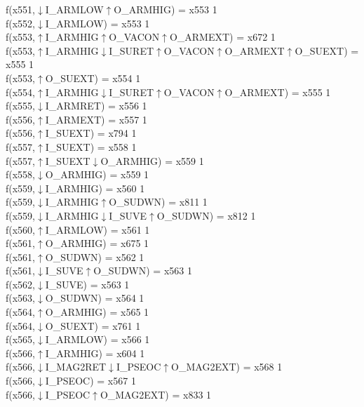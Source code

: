 f(x551,$\downarrow$I\_ARMLOW$\uparrow$O\_ARMHIG) = x553 {1} \\
f(x552,$\downarrow$I\_ARMLOW) = x553 {1} \\
f(x553,$\uparrow$I\_ARMHIG$\uparrow$O\_VACON$\uparrow$O\_ARMEXT) = x672 {1} \\
f(x553,$\uparrow$I\_ARMHIG$\downarrow$I\_SURET$\uparrow$O\_VACON$\uparrow$O\_ARMEXT$\uparrow$O\_SUEXT) = x555 {1} \\
f(x553,$\uparrow$O\_SUEXT) = x554 {1} \\
f(x554,$\uparrow$I\_ARMHIG$\downarrow$I\_SURET$\uparrow$O\_VACON$\uparrow$O\_ARMEXT) = x555 {1} \\
f(x555,$\downarrow$I\_ARMRET) = x556 {1} \\
f(x556,$\uparrow$I\_ARMEXT) = x557 {1} \\
f(x556,$\uparrow$I\_SUEXT) = x794 {1} \\
f(x557,$\uparrow$I\_SUEXT) = x558 {1} \\
f(x557,$\uparrow$I\_SUEXT$\downarrow$O\_ARMHIG) = x559 {1} \\
f(x558,$\downarrow$O\_ARMHIG) = x559 {1} \\
f(x559,$\downarrow$I\_ARMHIG) = x560 {1} \\
f(x559,$\downarrow$I\_ARMHIG$\uparrow$O\_SUDWN) = x811 {1} \\
f(x559,$\downarrow$I\_ARMHIG$\downarrow$I\_SUVE$\uparrow$O\_SUDWN) = x812 {1} \\
f(x560,$\uparrow$I\_ARMLOW) = x561 {1} \\
f(x561,$\uparrow$O\_ARMHIG) = x675 {1} \\
f(x561,$\uparrow$O\_SUDWN) = x562 {1} \\
f(x561,$\downarrow$I\_SUVE$\uparrow$O\_SUDWN) = x563 {1} \\
f(x562,$\downarrow$I\_SUVE) = x563 {1} \\
f(x563,$\downarrow$O\_SUDWN) = x564 {1} \\
f(x564,$\uparrow$O\_ARMHIG) = x565 {1} \\
f(x564,$\downarrow$O\_SUEXT) = x761 {1} \\
f(x565,$\downarrow$I\_ARMLOW) = x566 {1} \\
f(x566,$\uparrow$I\_ARMHIG) = x604 {1} \\
f(x566,$\downarrow$I\_MAG2RET$\downarrow$I\_PSEOC$\uparrow$O\_MAG2EXT) = x568 {1} \\
f(x566,$\downarrow$I\_PSEOC) = x567 {1} \\
f(x566,$\downarrow$I\_PSEOC$\uparrow$O\_MAG2EXT) = x833 {1} \\
